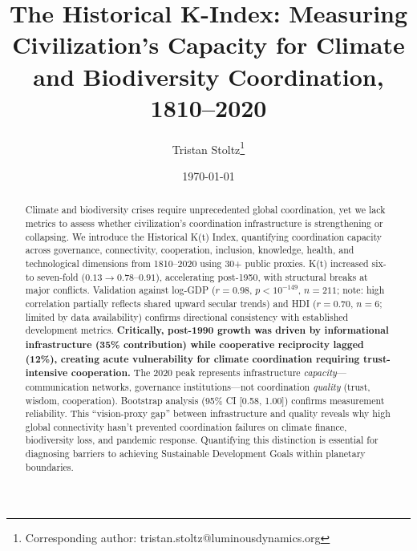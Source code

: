 \documentclass[11pt,letterpaper]{article}
\title{The Historical K-Index: Measuring Civilization's Capacity for Climate and Biodiversity Coordination, 1810--2020}
\author[1]{Tristan Stoltz\thanks{Corresponding author: tristan.stoltz@luminousdynamics.org}}
\affil[1]{Luminous Dynamics, LLC}
\date{\today}
\begin{document}
\linenumbers  %

\maketitle

\begin{abstract}
Climate and biodiversity crises require unprecedented global coordination, yet we lack metrics to assess whether civilization's coordination infrastructure is strengthening or collapsing. We introduce the Historical K(t) Index, quantifying coordination capacity across governance, connectivity, cooperation, inclusion, knowledge, health, and technological dimensions from 1810--2020 using 30+ public proxies. K(t) increased six- to seven-fold ($0.13 \to 0.78$--$0.91$), accelerating post-1950, with structural breaks at major conflicts. Validation against log-GDP ($r=0.98$, $p<10^{-149}$, $n=211$; note: high correlation partially reflects shared upward secular trends) and HDI ($r=0.70$, $n=6$; limited by data availability) confirms directional consistency with established development metrics. \textbf{Critically, post-1990 growth was driven by informational infrastructure (35\% contribution) while cooperative reciprocity lagged (12\%), creating acute vulnerability for climate coordination requiring trust-intensive cooperation.} The 2020 peak represents infrastructure \textit{capacity}---communication networks, governance institutions---not coordination \textit{quality} (trust, wisdom, cooperation). Bootstrap analysis (95\% CI [0.58, 1.00]) confirms measurement reliability. This ``vision-proxy gap'' between infrastructure and quality reveals why high global connectivity hasn't prevented coordination failures on climate finance, biodiversity loss, and pandemic response. Quantifying this distinction is essential for diagnosing barriers to achieving Sustainable Development Goals within planetary boundaries.
\end{abstract}
\end{document}
